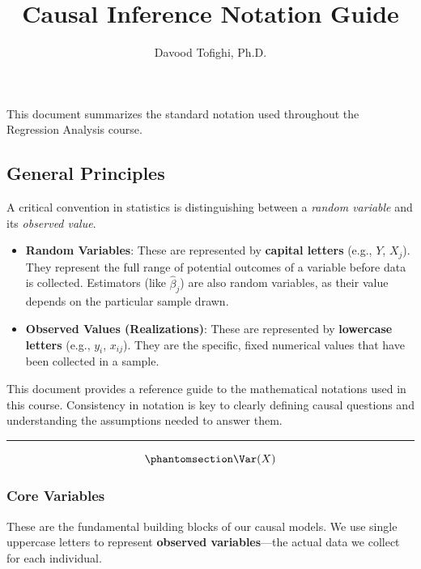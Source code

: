 \documentclass[
  letterpaper,
  DIV=11,
  numbers=noendperiod]{scrartcl}
\title{Causal Inference Notation Guide}
\author{Davood Tofighi, Ph.D.}
\date{}
\begin{document}
\maketitle


This document summarizes the standard notation used throughout the
Regression Analysis course.

\subsection{General Principles}\label{general-principles}

A critical convention in statistics is distinguishing between a
\emph{random variable} and its \emph{observed value}.

\begin{itemize}
\item
  \textbf{Random Variables}: These are represented by \textbf{capital
  letters} (e.g., \(Y\), \(X_j\)). They represent the full range of
  potential outcomes of a variable before data is collected. Estimators
  (like \(\hat{\beta}_j\)) are also random variables, as their value
  depends on the particular sample drawn.
\item
  \textbf{Observed Values (Realizations)}: These are represented by
  \textbf{lowercase letters} (e.g., \(y_i\), \(x_{ij}\)). They are the
  specific, fixed numerical values that have been collected in a sample.
\end{itemize}

This document provides a reference guide to the mathematical notations
used in this course. Consistency in notation is key to clearly defining
causal questions and understanding the assumptions needed to answer
them.

\begin{center}\rule{0.5\linewidth}{0.5pt}\end{center}

\begin{equation}\phantomsection\label{eq-wq}{
\Var(X)
}\end{equation}

\subsubsection{Core Variables}\label{core-variables}

These are the fundamental building blocks of our causal models. We use
single uppercase letters to represent \textbf{observed variables}---the
actual data we collect for each individual.
\end{document}
